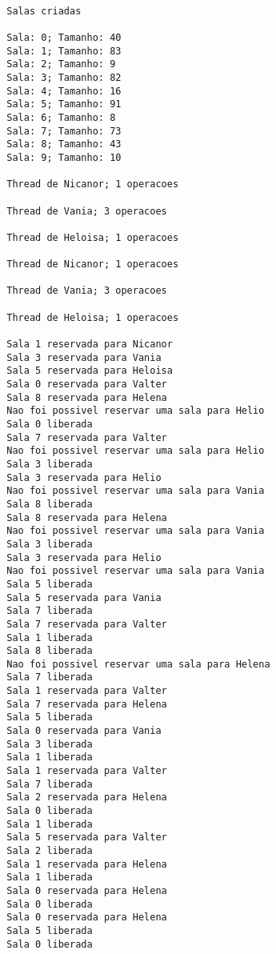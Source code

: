 \documentclass[12pt]{article}
\begin{document}
    \begin{verbatim}

        Salas criadas

        Sala: 0; Tamanho: 40
        Sala: 1; Tamanho: 83
        Sala: 2; Tamanho: 9
        Sala: 3; Tamanho: 82
        Sala: 4; Tamanho: 16
        Sala: 5; Tamanho: 91
        Sala: 6; Tamanho: 8
        Sala: 7; Tamanho: 73
        Sala: 8; Tamanho: 43
        Sala: 9; Tamanho: 10

        Thread de Nicanor; 1 operacoes

        Thread de Vania; 3 operacoes

        Thread de Heloisa; 1 operacoes

        Thread de Nicanor; 1 operacoes

        Thread de Vania; 3 operacoes

        Thread de Heloisa; 1 operacoes

        Sala 1 reservada para Nicanor
        Sala 3 reservada para Vania
        Sala 5 reservada para Heloisa
        Sala 0 reservada para Valter
        Sala 8 reservada para Helena
        Nao foi possivel reservar uma sala para Helio
        Sala 0 liberada
        Sala 7 reservada para Valter
        Nao foi possivel reservar uma sala para Helio
        Sala 3 liberada
        Sala 3 reservada para Helio
        Nao foi possivel reservar uma sala para Vania
        Sala 8 liberada
        Sala 8 reservada para Helena
        Nao foi possivel reservar uma sala para Vania
        Sala 3 liberada
        Sala 3 reservada para Helio
        Nao foi possivel reservar uma sala para Vania
        Sala 5 liberada
        Sala 5 reservada para Vania
        Sala 7 liberada
        Sala 7 reservada para Valter
        Sala 1 liberada
        Sala 8 liberada
        Nao foi possivel reservar uma sala para Helena
        Sala 7 liberada
        Sala 1 reservada para Valter
        Sala 7 reservada para Helena
        Sala 5 liberada
        Sala 0 reservada para Vania
        Sala 3 liberada
        Sala 1 liberada
        Sala 1 reservada para Valter
        Sala 7 liberada
        Sala 2 reservada para Helena
        Sala 0 liberada
        Sala 1 liberada
        Sala 5 reservada para Valter
        Sala 2 liberada
        Sala 1 reservada para Helena
        Sala 1 liberada
        Sala 0 reservada para Helena
        Sala 0 liberada
        Sala 0 reservada para Helena
        Sala 5 liberada
        Sala 0 liberada
    \end{verbatim}
\end{document}
